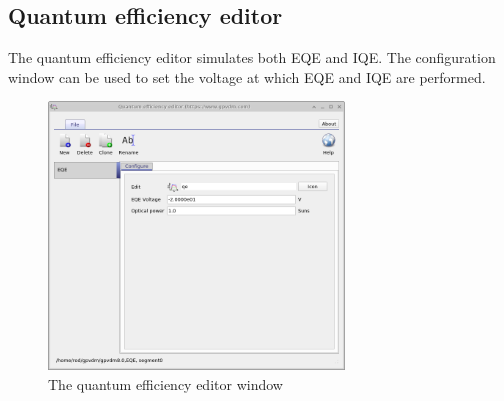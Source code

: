 \subsection{Quantum efficiency editor}
The quantum efficiency editor simulates both EQE and IQE.  The configuration window can be used to set the voltage at which EQE and IQE are performed.
\begin{figure}[H]
\centering
\includegraphics[width=0.7\textwidth,height=0.5\textwidth]{./images/qe_editor.png}
\caption{The quantum efficiency editor window}
\label{fig:qeeditor}
\end{figure}


